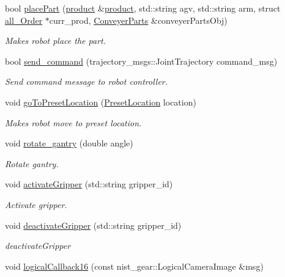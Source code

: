 \begin{DoxyCompactItemize}
bool \hyperlink{classGantryControl_a17e2fb32a16a33c989903c4c1495c878}{place\+Part} (\hyperlink{utils_8h_a48a7207852c0455cce7e65703b12ec7e}{product} \&\hyperlink{utils_8h_a48a7207852c0455cce7e65703b12ec7e}{product}, std\+::string agv, std\+::string arm, struct \hyperlink{structall__Order}{all\+\_\+\+Order} $\ast$curr\+\_\+prod, \hyperlink{classConveyerParts}{Conveyer\+Parts} \&conveyer\+Parts\+Obj)
\begin{DoxyCompactList}\small\item\em Makes robot place the part. \end{DoxyCompactList}\item 
bool \hyperlink{classGantryControl_ab271ce06b0d336eddb26e1ba5a2ce594}{send\+\_\+command} (trajectory\+\_\+msgs\+::\+Joint\+Trajectory command\+\_\+msg)
\begin{DoxyCompactList}\small\item\em Send command message to robot controller. \end{DoxyCompactList}\item 
void \hyperlink{classGantryControl_a6986d4f622840037e003c6db840d78ed}{go\+To\+Preset\+Location} (\hyperlink{structPresetLocation}{Preset\+Location} location)
\begin{DoxyCompactList}\small\item\em Makes robot move to preset location. \end{DoxyCompactList}\item 
void \hyperlink{classGantryControl_ad7a304b37a95f29634631d4183276be3}{rotate\+\_\+gantry} (double angle)
\begin{DoxyCompactList}\small\item\em Rotate gantry. \end{DoxyCompactList}\item 
void \hyperlink{classGantryControl_aaccd9c43b5564c198288ba51cbcecabe}{activate\+Gripper} (std\+::string gripper\+\_\+id)
\begin{DoxyCompactList}\small\item\em Activate gripper. \end{DoxyCompactList}\item 
void \hyperlink{classGantryControl_a1485577d4e29baf708a4c5c028a47798}{deactivate\+Gripper} (std\+::string gripper\+\_\+id)
\begin{DoxyCompactList}\small\item\em deactivate\+Gripper \end{DoxyCompactList}\item 
void \hyperlink{classGantryControl_a9206feae49953cf691e0dec2331cc3ae}{logical\+Callback16} (const nist\+\_\+gear\+::\+Logical\+Camera\+Image \&msg)

\end{DoxyCompactItemize}
